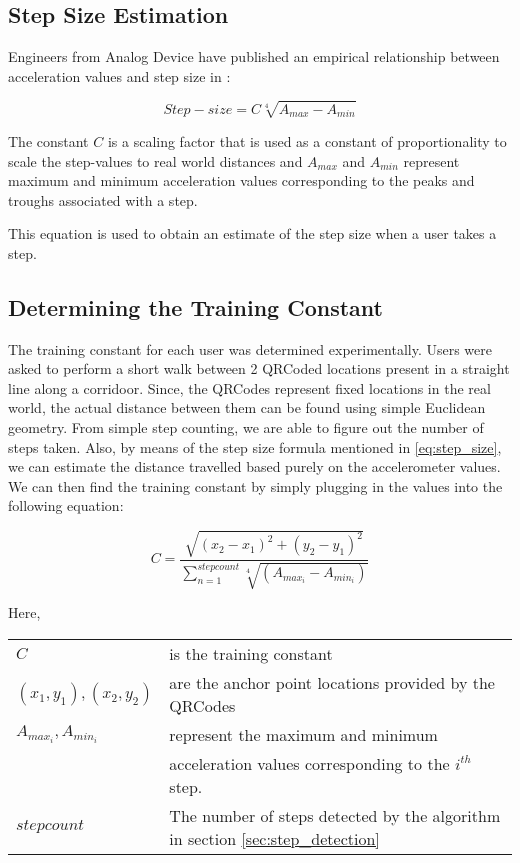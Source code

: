 \subsection{Step Size Estimation}

Engineers from Analog Device have published an empirical relationship between 
acceleration values and step size in \cite{ADXL202}:

\begin{equation}\label{eq:step_size}
 Step-size = C \sqrt[4]{A_{max} - A_{min}}
\end{equation}

The constant $C$ is a scaling factor that is used as a constant of proportionality
to scale the step-values to real world distances and $A_{max}$ and $A_{min}$
represent maximum and minimum acceleration values corresponding to the 
peaks and troughs associated with a step. 

This equation is used to obtain an estimate of the step size when a user 
takes a step.

\subsection{Determining the Training Constant}

The training constant for each user was determined experimentally. 
Users were asked to perform a short walk between 2 QRCoded locations
present in a straight line along a corridoor.
Since, the QRCodes represent fixed locations in the real world, the actual 
distance between them can be found using simple Euclidean geometry. From 
simple step counting, we are able to figure out the number of steps taken.
Also, by means of the step size formula mentioned in \eqref{eq:step_size},
we can estimate the distance travelled based purely on the accelerometer
values. We can then find the training constant by simply plugging in 
the values into the following equation:

\begin{equation}
C=\frac{\sqrt{(x_{2}-x_{1})^{2}+(y_{2}-y_{1})^{2}}}{\sum_{n=1}^{stepcount}\sqrt[4]{(A_{max_{i}}-A_{min_{i}})}}
\end{equation}

Here,\\
\begin{tabular}{l l}
$C$                         & is the training constant   \\
$(x_1, y_1), (x_2, y_2)$    & are the anchor point locations provided by the QRCodes \\
$A_{max_{i}}, A_{min_{i}}$  & represent the maximum and minimum \\
                            & acceleration values corresponding to the $i^{th}$ step.\\
$stepcount$                 & The number of steps detected by the algorithm in section \ref{sec:step_detection} \\
\end{tabular}


